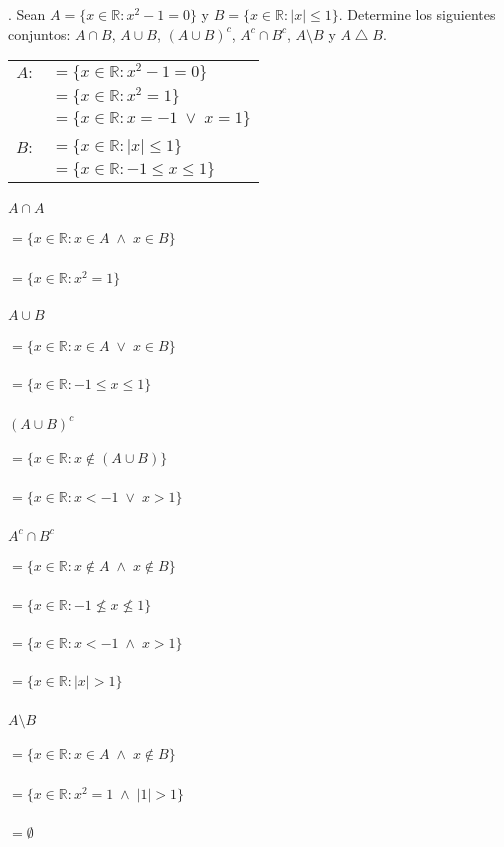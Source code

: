 \section{}
. Sean $A = \{x \in \mathbb{R} : x^2 - 1 = 0 \}$ y $B = \{x \in \mathbb{R} : |x| \leq 1\}$. Determine los siguientes conjuntos: $A \cap B$, $A \cup B$, $(A \cup B)^c$, $A^c \cap B^c$, $A \setminus B$ y $A \bigtriangleup B$.\\
 \begin{center}
  \begin{tabular}{r l}
$A:$ & $= \{x \in \mathbb{R} : x^2 - 1 = 0\}$\\
 & $= \{x \in \mathbb{R} :x^2 = 1\}$\\
  & $=\{x \in \mathbb{R} : x=-1 \;\vee\; x=1\}$\\
   & \\
$B:$ & $= \{x \in \mathbb{R} : |x| \leq 1\}$\\
 & $= \{x \in \mathbb{R} : -1 \leq x \leq1 \}$\\
  \end{tabular}
 \end{center}

\paragraph{$A \cap A$}
	\subparagraph{$ = \{x \in \mathbb{R} : x \in A \; \wedge \; x \in B\}$}
	\subparagraph{$ = \{x \in \mathbb{R} : x^2 = 1\}$}
\paragraph{$A \cup B$}
	\subparagraph{$= \{x \in \mathbb{R} : x\in A \;\vee\; x\in B\}$}
	\subparagraph{$= \{x \in \mathbb{R} : -1 \leq x \leq 1\}$}
\paragraph{$(A \cup B)^c$}
	\subparagraph{$= \{x \in \mathbb{R} : x \notin (A \cup B)\}$}
	\subparagraph{$= \{x \in \mathbb{R} : x<-1 \; \vee \; x>1\}$}
\paragraph{$A^c \cap B^c$}
	\subparagraph{$= \{x \in \mathbb{R} : x \notin A \; \wedge \; x \notin B\}$}
	\subparagraph{$= \{x \in \mathbb{R} : -1 \nleq x \nleq 1\}$}
	\subparagraph{$= \{x \in \mathbb{R} : x<-1 \; \wedge \; x>1\}$}
	\subparagraph{$= \{x \in \mathbb{R} : |x|>1\}$}
\paragraph{$A \setminus B$}
	\subparagraph{$= \{x \in \mathbb{R} : x \in A \; \wedge \; x \notin B\}$}
	\subparagraph{$= \{x \in \mathbb{R} : x^2 = 1 \; \wedge \; |1|>1\}$}
	\subparagraph{$= \emptyset$}
